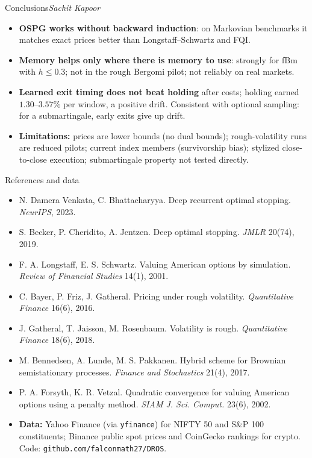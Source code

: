 \documentclass[aspectratio=169,11pt]{beamer}
\newcommand{\by}[1]{\hfill{\normalfont\small\itshape #1}}
\begin{document}
\begin{frame}{Conclusions\by{Sachit Kapoor}}
\begin{itemize}
\item \textbf{OSPG works without backward induction}: on Markovian benchmarks it matches exact
  prices better than Longstaff--Schwartz and FQI.
\item \textbf{Memory helps only where there is memory to use}: strongly for fBm with
  $h\le0.3$; not in the rough Bergomi pilot; not reliably on real markets.
\item \textbf{Learned exit timing does not beat holding} after costs; holding earned
  $1.30$--$3.57\%$ per window, a positive drift. Consistent with optional sampling: for a
  submartingale, early exits give up drift.
\item \textbf{Limitations:} prices are lower bounds (no dual bounds); rough-volatility runs are
  reduced pilots; current index members (survivorship bias); stylized close-to-close execution;
  submartingale property not tested directly.
\end{itemize}
\end{frame}

\begin{frame}{References and data}
\footnotesize
\begin{itemize}
\item N. Damera Venkata, C. Bhattacharyya. Deep recurrent optimal stopping. \emph{NeurIPS}, 2023.
\item S. Becker, P. Cheridito, A. Jentzen. Deep optimal stopping. \emph{JMLR} 20(74), 2019.
\item F. A. Longstaff, E. S. Schwartz. Valuing American options by simulation.
  \emph{Review of Financial Studies} 14(1), 2001.
\item C. Bayer, P. Friz, J. Gatheral. Pricing under rough volatility. \emph{Quantitative Finance} 16(6), 2016.
\item J. Gatheral, T. Jaisson, M. Rosenbaum. Volatility is rough. \emph{Quantitative Finance} 18(6), 2018.
\item M. Bennedsen, A. Lunde, M. S. Pakkanen. Hybrid scheme for Brownian semistationary processes.
  \emph{Finance and Stochastics} 21(4), 2017.
\item P. A. Forsyth, K. R. Vetzal. Quadratic convergence for valuing American options using a
  penalty method. \emph{SIAM J. Sci. Comput.} 23(6), 2002.
\item \textbf{Data:} Yahoo Finance (via \texttt{yfinance}) for NIFTY 50 and S\&P 100 constituents;
  Binance public spot prices and CoinGecko rankings for crypto. Code: \texttt{github.com/falconmath27/DROS}.
\end{itemize}
\end{frame}
\end{document}
